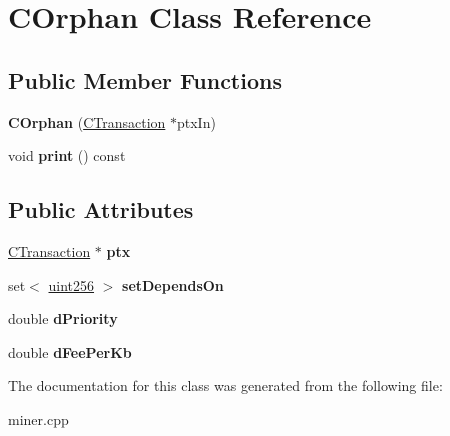 \hypertarget{class_c_orphan}{}\section{C\+Orphan Class Reference}
\label{class_c_orphan}
\subsection*{Public Member Functions}
\begin{DoxyCompactItemize}
\item 
\mbox{\label{class_c_orphan_ae097249b6ca0a184192058ad89f0ea0d}} 
{\bfseries C\+Orphan} (\mbox{\hyperlink{class_c_transaction}{C\+Transaction}} $\ast$ptx\+In)
\item 
\mbox{\label{class_c_orphan_a20c92138a6eed621a7cadf1c172fdfd4}} 
void {\bfseries print} () const
\end{DoxyCompactItemize}
\subsection*{Public Attributes}
\begin{DoxyCompactItemize}
\item 
\mbox{\label{class_c_orphan_ab00c8b3205357cd0c59545fefde0f1ae}} 
\mbox{\hyperlink{class_c_transaction}{C\+Transaction}} $\ast$ {\bfseries ptx}
\item 
\mbox{\label{class_c_orphan_a1b19183565d42c20ded09a2cc787fc50}} 
set$<$ \mbox{\hyperlink{classuint256}{uint256}} $>$ {\bfseries set\+Depends\+On}
\item 
\mbox{\label{class_c_orphan_a899f7928b6d4e9206ce04d5b2953da33}} 
double {\bfseries d\+Priority}
\item 
\mbox{\label{class_c_orphan_a4a0f70b5609ceee00be532fd2116587e}} 
double {\bfseries d\+Fee\+Per\+Kb}
\end{DoxyCompactItemize}


The documentation for this class was generated from the following file\+:\begin{DoxyCompactItemize}
\item 
miner.\+cpp\end{DoxyCompactItemize}
